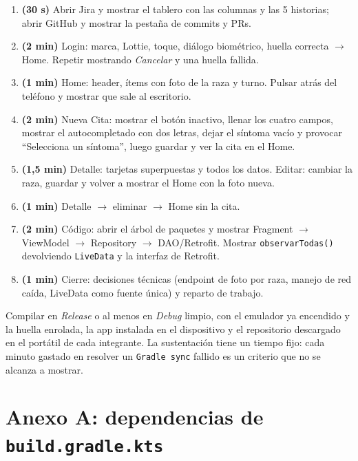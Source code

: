 \documentclass[11pt,letterpaper]{article}
\newcommand{\code}[1]{\texttt{\small #1}}
\begin{document}
\begin{enumerate}[leftmargin=1.6em,itemsep=2pt]
  \item \textbf{(30 s)} Abrir Jira y mostrar el tablero con las columnas y las 5
        historias; abrir GitHub y mostrar la pesta\~na de commits y PRs.
  \item \textbf{(2 min)} Login: marca, Lottie, toque, di\'alogo biom\'etrico,
        huella correcta $\to$ Home. Repetir mostrando \emph{Cancelar} y una
        huella fallida.
  \item \textbf{(1 min)} Home: header, \'items con foto de la raza y turno.
        Pulsar atr\'as del tel\'efono y mostrar que sale al escritorio.
  \item \textbf{(2 min)} Nueva Cita: mostrar el bot\'on inactivo, llenar los
        cuatro campos, mostrar el autocompletado con dos letras, dejar el
        s\'intoma vac\'io y provocar ``Selecciona un s\'intoma'', luego guardar y
        ver la cita en el Home.
  \item \textbf{(1,5 min)} Detalle: tarjetas superpuestas y todos los datos.
        Editar: cambiar la raza, guardar y volver a mostrar el Home con la foto
        nueva.
  \item \textbf{(1 min)} Detalle $\to$ eliminar $\to$ Home sin la cita.
  \item \textbf{(2 min)} C\'odigo: abrir el \'arbol de paquetes y mostrar
        Fragment $\to$ ViewModel $\to$ Repository $\to$ DAO/Retrofit. Mostrar
        \code{observarTodas(\allowbreak{})} devolviendo \code{LiveData} y la interfaz de
        Retrofit.
  \item \textbf{(1 min)} Cierre: decisiones t\'ecnicas (endpoint de foto por
        raza, manejo de red ca\'ida, LiveData como fuente \'unica) y reparto de
        trabajo.
\end{enumerate}

\begin{notabox}
Compilar en \emph{Release} o al menos en \emph{Debug} limpio, con el emulador ya
encendido y la huella enrolada, la app instalada en el dispositivo y el
repositorio descargado en el port\'atil de cada integrante. La sustentaci\'on
tiene un tiempo fijo: cada minuto gastado en resolver un \code{Gradle sync}
fallido es un criterio que no se alcanza a mostrar.
\end{notabox}

\newpage
\section{Anexo A: dependencias de \code{build.gradle.\allowbreak{}kts}}
\end{document}
